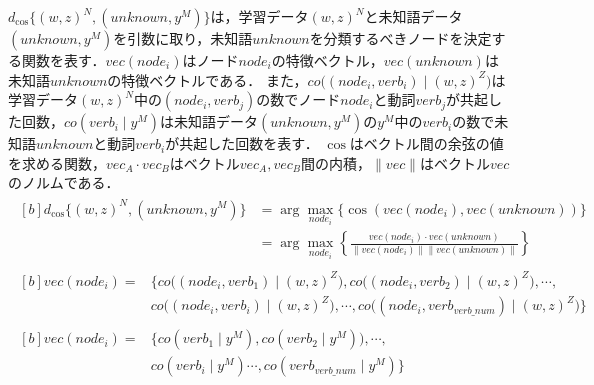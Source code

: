 \documentclass[japanese]{jnlp_1.4}
\begin{document}
$d_{\cos} \{ (w,z)^N , (\mathit{unknown}, y^M) \}$は，学習データ$(w,z)^N$と未知語データ$(\mathit{unknown}, y^M)$を引数に取り，未知語$\mathit{unknown}$を分類するべきノードを決定する関数を表す．$\mathit{vec}(\mathit{node}_i)$はノード$\mathit{node}_i$の特徴ベクトル，$\mathit{vec}(\mathit{unknown})$は未知語$\mathit{unknown}$の特徴ベクトルである．
また，$\mathit{co}\bigl( (\mathit{node}_i,\mathit{verb}_i) \mid (w,z)^Z \bigr)$は学習データ$(w,z)^N$中の$(\mathit{node}_i, \mathit{verb}_j)$の数でノード$\mathit{node}_i$と動詞$\mathit{verb}_j$が共起した回数，$\mathit{co}(\mathit{verb}_i \mid y^M)$は未知語データ$(\mathit{unknown}, y^M)$の$y^M$中の$\mathit{verb}_i$の数で未知語$\mathit{unknown}$と動詞$\mathit{verb}_i$が共起した回数を表す．
$\cos$はベクトル間の余弦の値を求める関数，$\mathit{vec}_A \cdot \mathit{vec}_B$はベクトル$\mathit{vec}_A, \mathit{vec}_B$間の内積，$\parallel \mathit{vec} \parallel$はベクトル$\mathit{vec}$のノルムである．
{\allowdisplaybreaks
\begin{gather}
\begin{aligned}[b]
 d_{\cos} \{ (w,z)^N , (\mathit{unknown}, y^M) \}
	& = \arg \max_{\mathit{node}_i} \{ \cos (\mathit{vec}(\mathit{node}_i), 
	\mathit{vec}(\mathit{unknown})) \} \\
	& = \arg \max_{\mathit{node}_i} \left\{ \frac{\mathit{vec}(\mathit{node}_i) 
	\cdot \mathit{vec}(\mathit{unknown})}
		{ \parallel \mathit{vec}(\mathit{node}_i) \parallel \parallel 
	\mathit{vec}(\mathit{unknown}) \parallel} \right\}
	\label{eq:vector_space_method1}
\end{aligned}\\
\begin{aligned}[b]
 \mathit{vec}(\mathit{node}_i) = 
	& \bigl\{ \mathit{co}\bigl( (\mathit{node}_i,\mathit{verb}_1) \mid (w,z)^Z \bigr), 
	\mathit{co}\bigl( (\mathit{node}_i,\mathit{verb}_2) 
	\mid (w,z)^Z \bigr), 
	\cdots, \\
	& \mathit{co}\bigl( (\mathit{node}_i,\mathit{verb}_i) \mid (w,z)^Z \bigr), 
	\cdots, \mathit{co}\bigl( (\mathit{node}_i,\mathit{verb}_{\mathit{verb}\_\mathit{num}}) 
	\mid (w,z)^Z \bigr)\bigr\}
	\label{eq:vector_space_method2}
\end{aligned}\\
\begin{aligned}[b]
 \mathit{vec}(\mathit{node}_i) = 
	& \bigl\{ \mathit{co}(\mathit{verb}_1 \mid y^M), \mathit{co}(\mathit{verb}_2 \mid y^M)), 
	\cdots, \\
	& \mathit{co}(\mathit{verb}_i \mid y^M) \cdots, \mathit{co}
	(\mathit{verb}_{\mathit{verb}\_\mathit{num}} \mid y^M) \bigr\}
	\label{eq:vector_space_method3}
\end{aligned}
\end{gather}
}
\end{document}

